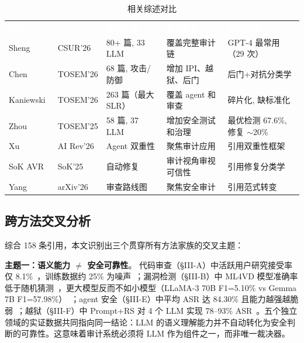 \documentclass[11pt,a4paper,onecolumn]{article}
\newcommand{\tabheader}[1]{\textcolor{white}{\textbf{#1}}}
\begin{document}
\begin{table}[t]
\caption{相关综述对比}
\label{tab:survey_compare}
\centering
\begin{tabularx}{\textwidth}{@{} p{}p{}X X X @{}}
\rowcolor{tabhead}
\tabheader{综述} & \tabheader{Venue} & \tabheader{覆盖范围} & \tabheader{本文差异} & \tabheader{互补价值} \\
\rowcolor{tabalt} Sheng~\cite{sheng2026llmsecurity} & CSUR'26 & 80+ 篇, 33 LLM & 覆盖完整审计链 & GPT-4 最常用（29 次） \\
Chen~\cite{chen2026lmcode} & TOSEM'26 & 68 篇, 攻击/防御 & 增加 IPI、越狱、后门 & 后门+对抗分类学 \\
\rowcolor{tabalt} Kaniewski~\cite{kaniewski2026detecting} & TOSEM'26 & 263 篇（最大 SLR） & 覆盖 agent 和审查 & 碎片化, 缺标准化 \\
Zhou~\cite{zhou2025vulndetrepair} & TOSEM'25 & 58 篇, 37 LLM & 增加安全测试和治理 & 最优检测 67.6\%, 修复 $\sim$20\% \\
\rowcolor{tabalt} Xu~\cite{xu2026duality} & AI Rev'26 & Agent 双重性 & 聚焦审计应用 & 引用双重性框架 \\
SoK AVR~\cite{sok2025avr} & SoK'25 & 自动修复 & 审计视角审视可信性 & 引用修复分类学 \\
\rowcolor{tabalt} Yang~\cite{yang_2026_roadmap} & arXiv'26 & 审查路线图 & 聚焦安全审计 & 引用范式转变 \\
\end{tabularx}
\end{table}

\subsection{跨方法交叉分析}
综合 158 条引用，本文识别出三个贯穿所有方法家族的交叉主题：

\textbf{主题一：语义能力 $\neq$ 安全可靠性}。
代码审查（§III-A）中活跃用户研究接受率仅 8.1\%~\cite{olewicki_2024_llm_review_impact}，训练数据约 25\% 为噪声~\cite{tufano_2024_strengths_weaknesses}；漏洞检测（§III-B）中 ML4VD 模型准确率低于随机猜测~\cite{risse2024limits}，更大模型反而不如小模型（LLaMA-3 70B F1=5.10\% vs Gemma 7B F1=57.98\%）~\cite{niu2025largetomammoth}；agent 安全（§III-E）中平均 ASR 达 84.30\% 且能力越强越脆弱~\cite{zhang2024asb}；越狱（§III-F）中 Prompt+RS 对 4 个 LLM 实现 78--93\% ASR~\cite{chao2024jailbreakbench}。五个独立领域的实证数据共同指向同一结论：LLM 的语义理解能力并不自动转化为安全判断的可靠性。这意味着审计系统必须将 LLM 作为组件之一，而非唯一裁决器。
\end{document}
